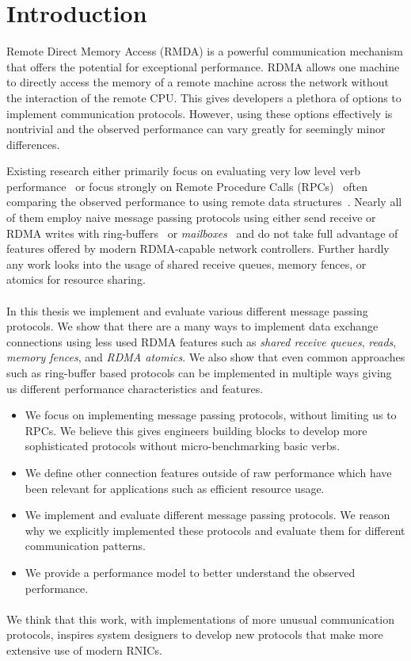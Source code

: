 \section{Introduction}

Remote Direct Memory Access (RMDA) is a powerful communication mechanism that offers the potential for exceptional performance.
RDMA allows one machine to directly access the memory of a remote machine across the network without the interaction of the 
remote CPU. This gives developers a plethora of options to implement communication protocols. However, using these options 
effectively is nontrivial and the observed performance can vary greatly for seemingly minor differences. 

Existing research either primarily focus on evaluating very low level verb performance~\cite{anuj-guide} or focus strongly on 
Remote Procedure Calls (RPCs)~\cite{eval-mpp} often comparing the observed performance to using remote data 
structures~\cite{fasst, rpc-vs-rdma}. Nearly all of them employ naive message passing protocols using either 
send receive or RDMA writes with ring-buffers~\cite{rdma-fast-dbms} or \emph{mailboxes}~\cite{ziegler2020rdma} and do not 
take full advantage of 
features offered by modern RDMA-capable network controllers. Further hardly any work looks into the usage of shared receive
queues, memory fences, or atomics for resource sharing.

\paragraph{}In this thesis we implement and evaluate various different message passing protocols. We show that there are a 
many ways to implement data exchange connections using less used RDMA features such as \emph{shared receive queues}, \emph{reads}, 
\emph{memory fences}, and \emph{RDMA atomics}. We also show that even common approaches such as ring-buffer based protocols 
can be implemented in multiple ways giving us different performance characteristics and features.

\begin{itemize}
  \item We focus on implementing message passing protocols, without limiting us to RPCs. We believe this gives engineers 
    building blocks to develop more sophisticated protocols without micro-benchmarking basic verbs.
  \item We define other connection features outside of raw performance which have been relevant for applications such as 
    efficient resource usage.
  \item We implement and evaluate different message passing protocols. We reason why we explicitly implemented these protocols
    and evaluate them for different communication patterns.
  \item We provide a performance model to better understand the observed performance.
\end{itemize}

\paragraph{}We think that this work, with 
implementations of more unusual communication protocols, inspires system designers to develop 
new protocols that make more extensive use of modern RNICs.


